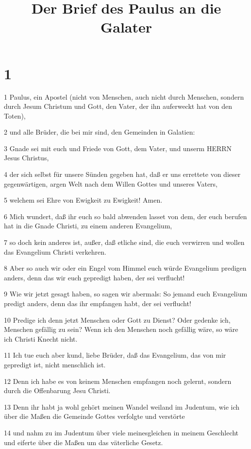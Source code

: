 

\title{Der Brief des Paulus an die Galater}


\chapter{1}

\par 1 Paulus, ein Apostel (nicht von Menschen, auch nicht durch Menschen, sondern durch Jesum Christum und Gott, den Vater, der ihn auferweckt hat von den Toten),
\par 2 und alle Brüder, die bei mir sind, den Gemeinden in Galatien:
\par 3 Gnade sei mit euch und Friede von Gott, dem Vater, und unserm HERRN Jesus Christus,
\par 4 der sich selbst für unsere Sünden gegeben hat, daß er uns errettete von dieser gegenwärtigen, argen Welt nach dem Willen Gottes und unseres Vaters,
\par 5 welchem sei Ehre von Ewigkeit zu Ewigkeit! Amen.
\par 6 Mich wundert, daß ihr euch so bald abwenden lasset von dem, der euch berufen hat in die Gnade Christi, zu einem anderen Evangelium,
\par 7 so doch kein anderes ist, außer, daß etliche sind, die euch verwirren und wollen das Evangelium Christi verkehren.
\par 8 Aber so auch wir oder ein Engel vom Himmel euch würde Evangelium predigen anders, denn das wir euch gepredigt haben, der sei verflucht!
\par 9 Wie wir jetzt gesagt haben, so sagen wir abermals: So jemand euch Evangelium predigt anders, denn das ihr empfangen habt, der sei verflucht!
\par 10 Predige ich denn jetzt Menschen oder Gott zu Dienst? Oder gedenke ich, Menschen gefällig zu sein? Wenn ich den Menschen noch gefällig wäre, so wäre ich Christi Knecht nicht.
\par 11 Ich tue euch aber kund, liebe Brüder, daß das Evangelium, das von mir gepredigt ist, nicht menschlich ist.
\par 12 Denn ich habe es von keinem Menschen empfangen noch gelernt, sondern durch die Offenbarung Jesu Christi.
\par 13 Denn ihr habt ja wohl gehört meinen Wandel weiland im Judentum, wie ich über die Maßen die Gemeinde Gottes verfolgte und verstörte
\par 14 und nahm zu im Judentum über viele meinesgleichen in meinem Geschlecht und eiferte über die Maßen um das väterliche Gesetz.
